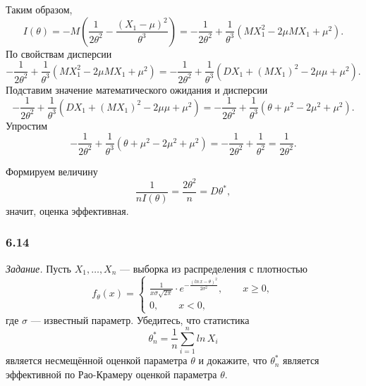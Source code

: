 Таким образом,
$$I \left( \theta \right) =
  -M \left( \frac{1}{2 \theta^2} - \frac{ \left( X_1 - \mu \right)^2}{ \theta^3} \right) =
  - \frac{1}{2 \theta^2} + \frac{1}{ \theta^3} \left( MX_1^2 - 2 \mu MX_1 + \mu^2 \right).$$
По свойствам дисперсии
$$- \frac{1}{2 \theta^2} + \frac{1}{ \theta^3} \left( MX_1^2 - 2 \mu MX_1 + \mu^2 \right) =
  - \frac{1}{2 \theta^2} +
  \frac{1}{ \theta^3} \left( DX_1 + \left( MX_1 \right)^2 - 2 \mu \mu + \mu^2 \right).$$
Подставим значение математического ожидания и дисперсии
$$- \frac{1}{2 \theta^2} +
  \frac{1}{ \theta^3} \left( DX_1 + \left( MX_1 \right)^2 - 2 \mu \mu + \mu^2 \right) =
  - \frac{1}{2 \theta^2} + \frac{1}{ \theta^3} \left( \theta + \mu^2 - 2 \mu^2 + \mu^2 \right).$$
Упростим
$$- \frac{1}{2 \theta^2} + \frac{1}{ \theta^3} \left( \theta + \mu^2 - 2 \mu^2 + \mu^2 \right) =
  - \frac{1}{2 \theta^2} + \frac{1}{ \theta^2} =
  \frac{1}{2 \theta^2}.$$

Формируем величину
$$ \frac{1}{nI \left( \theta \right) } =
  \frac{2 \theta^2}{n} =
  D \theta^*,$$
значит, оценка эффективная.

\subsubsection*{6.14}

\textit{Задание.} Пусть $X_1, \dotsc, X_n$ --- выборка из распределения с плотностью
$$f_{ \theta } \left( x \right) =
  \begin{cases}
    \frac{1}{x \sigma \sqrt{2 \pi }} \cdot
    e^{- \frac{ \left( ln \, x - \theta \right)^2}{2 \sigma^2}}, \qquad x \geq 0, \\
    0, \qquad x < 0,
  \end{cases}$$
где $ \sigma $ --- известный параметр.
Убедитесь, что статистика
$$ \theta_n^* =
  \frac{1}{n} \sum \limits_{i = 1}^n ln \, X_i$$
является несмещённой оценкой параметра $ \theta $ и докажите,
что $ \theta_n^*$ является эффективной по Рао-Крамеру оценкой параметра $ \theta $.


